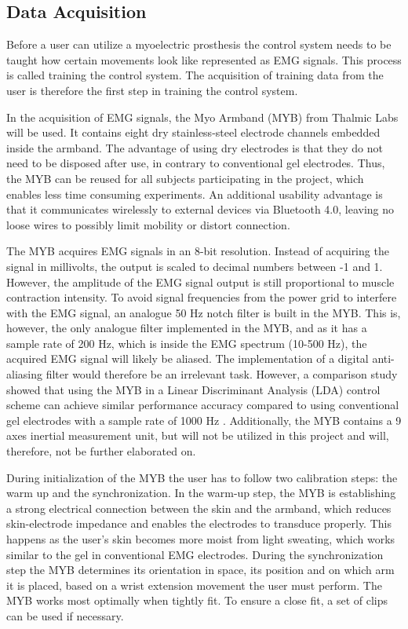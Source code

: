 \subsection{Data Acquisition} \label{sec:MYO}
Before a user can utilize a myoelectric prosthesis the control system needs to be taught how certain movements look like represented as EMG signals. This process is called training the control system. The acquisition of training data from the user is therefore the first step in training the control system.

In the acquisition of EMG signals, the Myo Armband (MYB) from Thalmic Labs will be used. It contains eight dry stainless-steel electrode channels embedded inside the armband. The advantage of using dry electrodes is that they do not need to be disposed after use, in contrary to conventional gel electrodes. Thus, the MYB can be reused for all subjects participating in the project, which enables less time consuming experiments. An additional usability advantage is that it communicates wirelessly to external devices via Bluetooth 4.0, leaving no loose wires to possibly limit mobility or distort connection. \cite{Myoarmband2013} 

The MYB acquires EMG signals in an 8-bit resolution. Instead of acquiring the signal in millivolts, the output is scaled to decimal numbers between -1 and 1. However, the amplitude of the EMG signal output is still proportional to muscle contraction intensity. To avoid signal frequencies from the power grid to interfere with the EMG signal, an analogue 50 Hz notch filter is built in the MYB. This is, however, the only analogue filter implemented in the MYB, and as it has a sample rate of 200 Hz, which is inside the EMG spectrum (10-500 Hz), the acquired EMG signal will likely be aliased. The implementation of a digital anti-aliasing filter would therefore be an irrelevant task. However, a comparison study showed that using the MYB in a Linear Discriminant Analysis (LDA) control scheme can achieve similar performance accuracy compared to using conventional gel electrodes with a sample rate of 1000 Hz \cite{Mendez2017}. Additionally, the MYB contains a 9 axes inertial measurement unit, but will not be utilized in this project and will, therefore, not be further elaborated on. \cite{Myoarmband2013} 

During initialization of the MYB the user has to follow two calibration steps: the warm up and the synchronization. In the warm-up step, the MYB is establishing a strong electrical connection between the skin and the armband, which reduces skin-electrode impedance and enables the electrodes to transduce properly. This happens as the user's skin becomes more moist from light sweating, which works similar to the gel in conventional EMG electrodes. During the synchronization step the MYB determines its orientation in space, its position and on which arm it is placed, based on a wrist extension movement the user must perform. 
The MYB works most optimally when tightly fit. To ensure a close fit, a set of clips can be used if necessary. \cite{Myoarmband2013}

